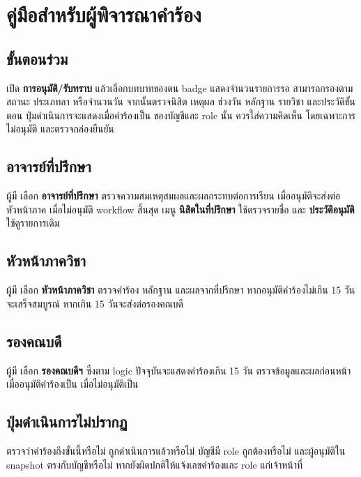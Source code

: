\section{คู่มือสำหรับผู้พิจารณาคำร้อง}
\subsection{ขั้นตอนร่วม}
เปิด \textbf{การอนุมัติ/รับทราบ} แล้วเลือกบทบาทของตน badge แสดงจำนวนรายการรอ สามารถกรองตามสถานะ ประเภทลา หรือจำนวนวัน จากนั้นตรวจนิสิต เหตุผล ช่วงวัน หลักฐาน รายวิชา และประวัติขั้นตอน ปุ่มดำเนินการจะแสดงเมื่อคำร้องเป็น  ของบัญชีและ role นั้น ควรใส่ความคิดเห็น โดยเฉพาะการไม่อนุมัติ และตรวจกล่องยืนยัน

\subsection{อาจารย์ที่ปรึกษา}
ผู้มี  เลือก \textbf{อาจารย์ที่ปรึกษา} ตรวจความสมเหตุสมผลและผลกระทบต่อการเรียน เมื่ออนุมัติจะส่งต่อหัวหน้าภาค เมื่อไม่อนุมัติ workflow สิ้นสุด เมนู \textbf{นิสิตในที่ปรึกษา} ใช้ตรวจรายชื่อ และ \textbf{ประวัติอนุมัติ} ใช้ดูรายการเดิม

\subsection{หัวหน้าภาควิชา}
ผู้มี  เลือก \textbf{หัวหน้าภาควิชา} ตรวจคำร้อง หลักฐาน และผลจากที่ปรึกษา หากอนุมัติคำร้องไม่เกิน 15 วันจะเสร็จสมบูรณ์ หากเกิน 15 วันจะส่งต่อรองคณบดี

\subsection{รองคณบดี}
ผู้มี  เลือก \textbf{รองคณบดีฯ} ซึ่งตาม logic ปัจจุบันจะแสดงคำร้องเกิน 15 วัน ตรวจข้อมูลและผลก่อนหน้า เมื่ออนุมัติคำร้องเป็น  เมื่อไม่อนุมัติเป็น 

\subsection{ปุ่มดำเนินการไม่ปรากฏ}
ตรวจว่าคำร้องถึงขั้นนี้หรือไม่ ถูกดำเนินการแล้วหรือไม่ บัญชีมี role ถูกต้องหรือไม่ และผู้อนุมัติใน snapshot ตรงกับบัญชีหรือไม่ หากยังผิดปกติให้แจ้งเลขคำร้องและ role แก่เจ้าหน้าที่
